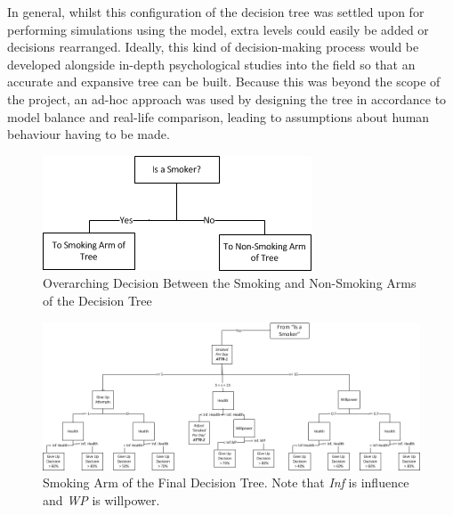 \documentclass[]{report}
\begin{document}
In general, whilst this configuration of the decision tree was settled upon for performing simulations using the model, extra levels could easily be added or decisions rearranged. Ideally, this kind of decision-making process would be developed alongside in-depth psychological studies into the field so that an accurate and expansive tree can be built. Because this was beyond the scope of the project, an ad-hoc approach was used by designing the tree in accordance to model balance and real-life comparison, leading to assumptions about human behaviour having to be made.

\begin{figure}
\begin{center}
\includegraphics[scale=1]{overarch.png}
\caption{Overarching Decision Between the Smoking and Non-Smoking Arms of the Decision Tree}
\label{img:overarch}
\end{center}
\end{figure}

\begin{landscape}
\begin{figure}
\begin{center}
\includegraphics[width=\paperwidth,keepaspectratio]{Dectree-left.png}
\caption{Smoking Arm of the Final Decision Tree. Note that \emph{Inf} is influence and \emph{WP} is willpower.}
\label{img:dectree-left}
\end{center}
\end{figure}
\end{landscape}
\end{document}
